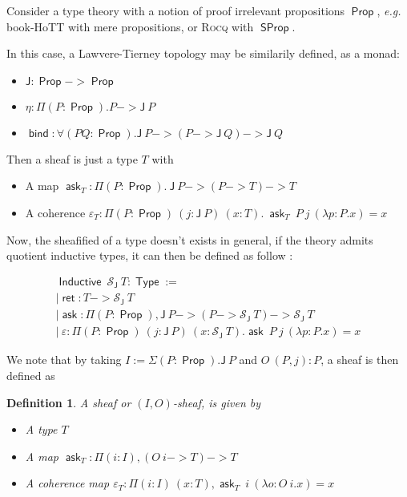 \documentclass[11pt]{article}
\newtheorem{definition}[theorem]{Definition}
\DeclareMathOperator{\Prop}{\mathsf{Prop}}
\DeclareMathOperator{\SProp}{\mathsf{SProp}}
\DeclareMathOperator{\Type}{\mathsf{Type}}
\DeclareMathOperator{\ask}{\mathsf{ask}}
\DeclareMathOperator{\bind}{\mathsf{bind}}
\DeclareMathOperator{\Inductive}{\mathsf{Inductive}}
\DeclareMathOperator{\ret}{\mathsf{ret}}
\newcommand{\0}{\mathbf{0}}
\newcommand{\1}{\mathbf{1}}
\begin{document}
Consider a type theory with a notion of proof irrelevant propositions $\Prop$, \emph{e.g.} book-HoTT with mere propositions, or \textsc{Rocq} with $\SProp$.

In this case, a Lawvere-Tierney topology may be similarily defined, as a monad:
\begin{itemize}
    \item $\mathsf{J} : \Prop -> \Prop$
    \item $\eta : \Pi (P:\Prop).P -> \mathsf{J}\ P$
    \item $\bind : \forall (P Q: \Prop). \mathsf{J}\ P -> (P -> \mathsf{J}\ Q) -> \mathsf{J}\ Q$
\end{itemize}

Then a sheaf is just a type $T$ with 
\begin{itemize}
    \item A map $\ask_T : \Pi (P:\Prop).\ \mathsf{J}\ P -> (P -> T) -> T$
    \item A coherence $\varepsilon_T : \Pi (P:\Prop)\ (j : \mathsf{J}\ P)\ (x:T).\ \ask_T\ P\ j\ (\lambda p:P.x) = x$
\end{itemize}

Now, the sheafified of a type doesn't exists in general, if the theory admits quotient inductive types, it can then be defined as follow :

$$
\begin{array}{l}
    \Inductive\ \mathcal{S}_{\mathsf{J}}\ T : \Type := \\
    | \ret : T -> \mathcal{S}_{\mathsf{J}}\ T\\
    | \ask : \Pi (P:\Prop), \mathsf{J}\ P -> (P -> \mathcal{S}_{\mathsf{J}}\ T) -> \mathcal{S}_{\mathsf{J}}\ T\\
    |\ \varepsilon : \Pi (P:\Prop)\ (j : \mathsf J\ P)\ (x : \mathcal{S}_{\mathsf{J}}\ T). \ask\ P\ j\ (\lambda p:P. x) = x
\end{array}
$$

We note that by taking $I := \Sigma (P:\Prop). \mathsf{J}\ P$ and $O\ (P,j) : P$, a sheaf is then defined as
\begin{definition}\label{IOshf}
    A \emph{sheaf} or \emph{$(I,O)$-sheaf}, is given by
\begin{itemize}
    \item A type $T$
    \item A map $\ask_T : \Pi (i:I), (O\ i -> T) -> T$
    \item A coherence map $\varepsilon_T : \Pi(i:I)\ (x:T), \ask_T\ i\ (\lambda o:O\  i.x) = x$
\end{itemize}

\end{definition}
\end{document}
